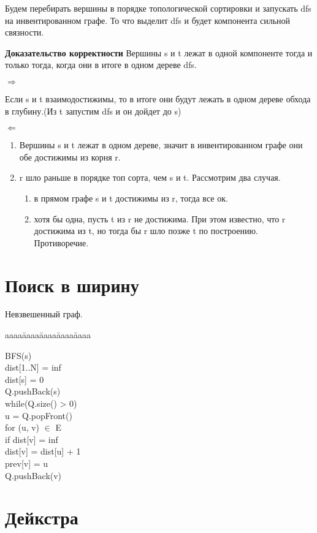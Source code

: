 \documentclass[12pt]{article}
\def\t{\texttt}
\newenvironment{MyTabbing}{
\t\bgroup
\begin{tabbing}
aaaa\=aaaa\=aaaa\=aaaa\=aaaa\kill
}{
\end{tabbing}
\t\egroup
}
\begin{document}
Будем перебирать вершины в порядке топологической сортировки и запускать dfs на инвентированном графе. То что выделит dfs и будет компонента сильной связности.

{\bf Доказательство корректности}
 Вершины s и t лежат в одной компоненте тогда и только тогда, когда они в итоге в одном дереве dfs.

$\Rightarrow$

Если s и  t взаимодостижимы, то в итоге они будут лежать в одном дереве обхода в глубину.(Из t запустим dfs и он дойдет до s)

$\Leftarrow$

\begin{enumerate}
\item Вершины s и t лежат в одном дереве, значит в инвентированном графе они обе достижимы из корня r.
\item r шло раньше в порядке топ сорта, чем s и t.
Рассмотрим два случая. 
\begin{enumerate}
\item в прямом графе s и t достижимы из r, тогда все ок. 
\item хотя бы одна, пусть t из r не достижима. При этом известно, что r достижима из t, но тогда бы r шло позже t по построению. Противоречие. 
\end{enumerate} 
\end{enumerate}

\section{Поиск в ширину}

Невзвешенный граф.

\begin{MyTabbing}
BFS(s)\\
\>dist[1..N] = inf\\
\>dist[s] = 0\\
\>Q.pushBack(s)\\
\>while(Q.size() > 0)\\
\>\>u = Q.popFront()\\
\>\>for (u, v) $\in$ E\\
\>\>\>if dist[v] = inf\\
\>\>\>\>dist[v] = dist[u] + 1\\
\>\>\>\>prev[v] = u\\
\>\>\>\>Q.pushBack(v)\\
\end{MyTabbing}

\section{Дейкстра}
\end{document}
